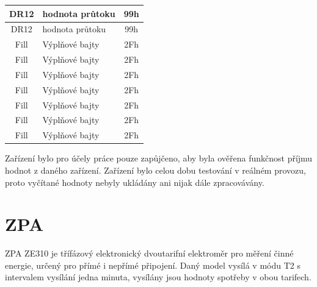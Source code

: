 \begin{table}[!ht]
\begin{tabular}{|c|l|c|}
DR12               & hodnota průtoku       & 99h \\ \hline
DR12               & hodnota průtoku       & 99h \\ \hline
Fill               & Výplňové bajty         & 2Fh \\ \hline
Fill               & Výplňové bajty         & 2Fh \\ \hline
Fill               & Výplňové bajty         & 2Fh \\ \hline
Fill               & Výplňové bajty         & 2Fh \\ \hline
Fill               & Výplňové bajty         & 2Fh \\ \hline
Fill               & Výplňové bajty         & 2Fh \\ \hline
Fill               & Výplňové bajty         & 2Fh \\ \hline \hline
\end{tabular}%
\end{table}

\vspace{10pt}

Zařízení bylo pro účely práce pouze zapůjčeno, aby byla ověřena funkčnost příjmu hodnot z daného zařízení. Zařízení bylo celou dobu testování v reálném provozu, proto vyčítané hodnoty nebyly ukládány ani nijak dále zpracovávány.

\newpage
	
	
	\section{ZPA}

ZPA ZE310 je třífázový elektronický dvoutarifní elektroměr pro měření činné energie, určený pro přímé i nepřímé připojení. Daný model vysílá v módu T2 s intervalem vysílání jedna minuta, vysílány jsou hodnoty spotřeby v obou tarifech.

